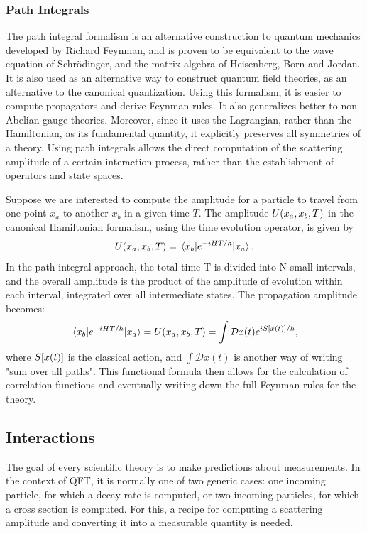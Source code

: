 \subsubsection{Path Integrals}
\label{sec:path-integrals}

The path integral formalism is an alternative construction to quantum mechanics developed by Richard Feynman, and is proven to be equivalent to the wave equation of Schrödinger, and the matrix algebra of Heisenberg, Born and Jordan. It is also used as an alternative way to construct quantum field theories, as an alternative to the canonical quantization. Using this formalism, it is easier to compute propagators and derive Feynman rules. It also generalizes better to non-Abelian gauge theories. Moreover, since it uses the Lagrangian, rather than the Hamiltonian, as its fundamental quantity, it explicitly preserves all symmetries of a theory. Using path integrals allows the direct computation of the scattering amplitude of a certain interaction process, rather than the establishment of operators and state spaces. 

Suppose we are interested to compute the amplitude for a particle to travel from one point $x_a$ to another $x_b$ in a given time $T$. The amplitude $U\qty(x_a,x_b,T)$ in the canonical Hamiltonian formalism, using the time evolution operator, is given by
\begin{equation}
U\qty(x_a,x_b,T)=\mel{x_b}{e^{-iHT/\hbar}}{x_a}.
\end{equation}
In the path integral approach, the total time T is divided into N small intervals, and the overall amplitude is the product of the amplitude of evolution within each interval, integrated over all intermediate states. The propagation amplitude becomes:
\begin{equation}
\mel{x_b}{e^{-iHT/\hbar}}{x_a}=U\qty(x_a,x_b,T)=\int \mathcal{D}x(t)e^{iS\qty[x(t)]/\hbar},
\end{equation}
where $S\qty[x(t)]$ is the classical action, and $\int \mathcal{D}x(t)$ is another way of writing "sum over all paths". This functional formula then allows for the calculation of correlation functions and eventually writing down the full Feynman rules for the theory.

\subsection{Interactions}

The goal of every scientific theory is to make predictions about measurements. In the context of QFT, it is normally one of two generic cases: one incoming particle, for which a decay rate is computed, or two incoming particles, for which a cross section is computed. For this, a recipe for computing a scattering amplitude and converting it into a measurable quantity is needed.

